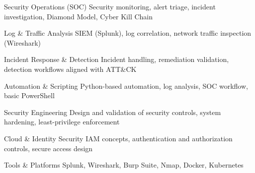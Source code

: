 
\begin{cvskills}

  \cvskill
    {Security Operations (SOC)}
    {{Security monitoring, alert triage, incident investigation, Diamond Model, Cyber Kill Chain}}

  \cvskill
    {Log \& Traffic Analysis}
    {SIEM (Splunk), log correlation, network traffic inspection (Wireshark)}

  \cvskill
    {Incident Response \& Detection}
    {Incident handling, remediation validation, detection workflows aligned with ATT\&CK}

  \cvskill
    {Automation \& Scripting}
    {Python-based automation, log analysis, SOC workflow, basic PowerShell}

  \cvskill
    {Security Engineering}
    {Design and validation of security controls, system hardening, least-privilege enforcement}

  \cvskill
    {Cloud \& Identity Security}
    {IAM concepts, authentication and authorization controls, secure access design}

  \cvskill
    {Tools \& Platforms}
    {Splunk, Wireshark, Burp Suite, Nmap, Docker, Kubernetes}




\end{cvskills}